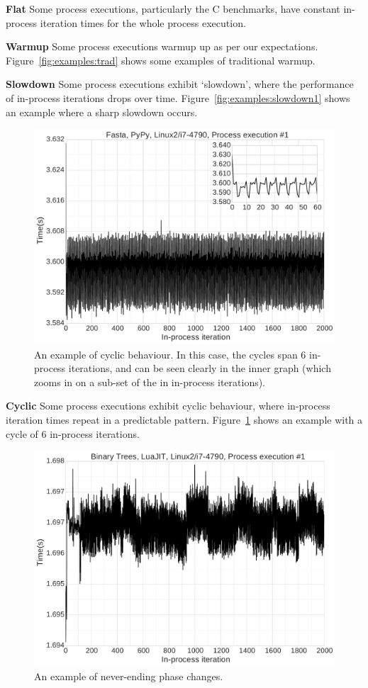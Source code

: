 \documentclass[preprint,numbers,10pt]{sigplanconf}
\begin{document}
\textbf{Flat} Some process executions, particularly the C benchmarks, have
constant in-process iteration times for the whole process execution.

\textbf{Warmup} Some process executions warmup up as per our
expectations. Figure~\ref{fig:examples:trad} shows some examples of traditional
warmup.

\textbf{Slowdown} \label{sub:slowdowns}
Some process executions exhibit `slowdown', where the performance of
in-process iterations drops over time. Figure~\ref{fig:examples:slowdown1} shows
an example where a sharp slowdown occurs.

\begin{figure}[tbp]
\includegraphics[width=.475\textwidth]{examples/cycles1}
\caption{An example of cyclic behaviour. In this case, the cycles span 6 in-process iterations,
and can be seen clearly in the inner graph (which zooms in on a sub-set of the in in-process
iterations).}
\label{fig:examples:cycles}
\end{figure}


\textbf{Cyclic} \label{sub:cyclic}
Some process executions exhibit cyclic behaviour, where in-process iteration times
repeat in a predictable pattern. 
Figure~\ref{fig:examples:cycles} shows
an example with a cycle of 6 in-process iterations.


\begin{figure}[t]
\includegraphics[width=.475\textwidth]{examples/many_phases}
\caption{An example of never-ending phase changes.}
\label{fig:examples:neverending}
\end{figure}
\end{document}
